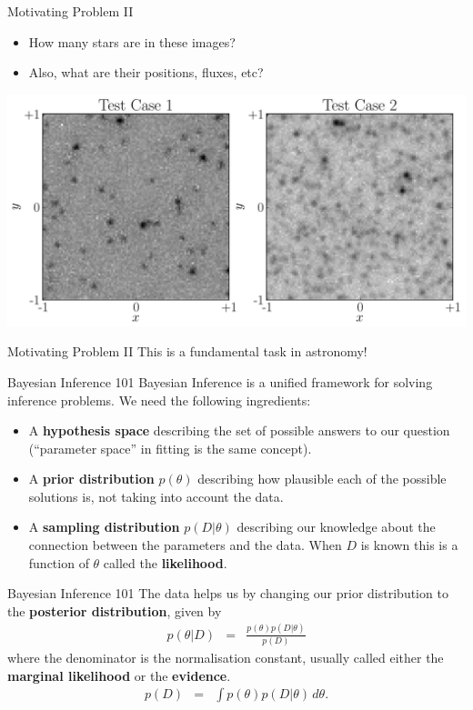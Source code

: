 \begin{frame}[t]{Motivating Problem II}
\begin{itemize}
\item How many stars are in these images?
\item Also, what are their positions, fluxes, etc?
\end{itemize}
\begin{center}
\includegraphics[scale=0.35]{test_cases.pdf}
\end{center}
\end{frame}

\begin{frame}[t]{Motivating Problem II}
This is a fundamental task in astronomy!
\end{frame}


\begin{frame}[t]{Bayesian Inference 101}
Bayesian Inference is a unified framework for solving inference problems.
We need the following ingredients:

\begin{itemize}
\setlength{\itemsep}{20pt}
\item A {\bf hypothesis space} describing the set of possible answers to our
question (``parameter space'' in fitting is the same concept).
\item A {\bf prior distribution} $p(\theta)$ describing how plausible
each of the possible solutions is, not taking into account the data.
\item A {\bf sampling distribution} $p(D | \theta)$ describing our knowledge
about the connection between the parameters and the data. When $D$ is known
this is a function of $\theta$ called the {\bf likelihood}.
\end{itemize}

\end{frame}


\begin{frame}[t]{Bayesian Inference 101}
The data helps us by changing our prior distribution to the {\bf posterior
distribution}, given by
\begin{eqnarray}
p(\theta | D) &=& \frac{p(\theta) p(D|\theta)}{p(D)}
\end{eqnarray}
where the denominator is the normalisation constant, usually called either
the {\bf marginal likelihood} or the {\bf evidence}.
\begin{eqnarray}
p(D) &=& \int p(\theta)p(D|\theta) \, d\theta.
\end{eqnarray}

\end{frame}

